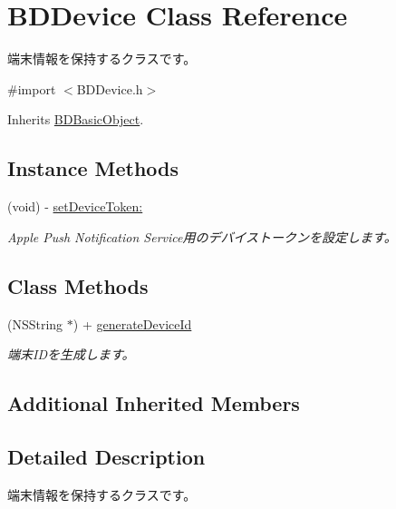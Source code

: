 \hypertarget{interface_b_d_device}{\section{B\-D\-Device Class Reference}
\label{interface_b_d_device}
}


端末情報を保持するクラスです。  




{\ttfamily \#import $<$B\-D\-Device.\-h$>$}



Inherits \hyperlink{interface_b_d_basic_object}{B\-D\-Basic\-Object}.

\subsection*{Instance Methods}
\begin{DoxyCompactItemize}
\item 
(void) -\/ \hyperlink{interface_b_d_device_a31bfeb9d837261aae4db0aaefeee1232}{set\-Device\-Token\-:}
\begin{DoxyCompactList}\small\item\em Apple Push Notification Service用のデバイストークンを設定します。 \end{DoxyCompactList}\end{DoxyCompactItemize}
\subsection*{Class Methods}
\begin{DoxyCompactItemize}
\item 
(N\-S\-String $\ast$) + \hyperlink{interface_b_d_device_a036ade0e1ff50bd43fee952121a5289a}{generate\-Device\-Id}
\begin{DoxyCompactList}\small\item\em 端末\-I\-Dを生成します。 \end{DoxyCompactList}\end{DoxyCompactItemize}
\subsection*{Additional Inherited Members}


\subsection{Detailed Description}
端末情報を保持するクラスです。 

